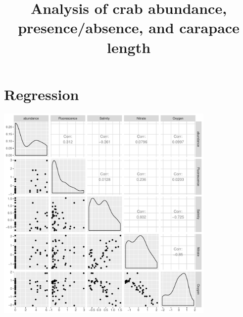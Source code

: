 \documentclass[letterpaper,12pt]{article}\usepackage[]{graphicx}\usepackage[]{color}
\newenvironment{knitrout}{}{} %
\begin{document}
\title{Analysis of crab abundance, presence/absence, and carapace length}
\maketitle

\section{Regression}



\begin{knitrout}
\color{fgcolor}
\includegraphics[width=0.8\textwidth]{figure/unnamed-chunk-3-1} 

\end{knitrout}
\end{document}
